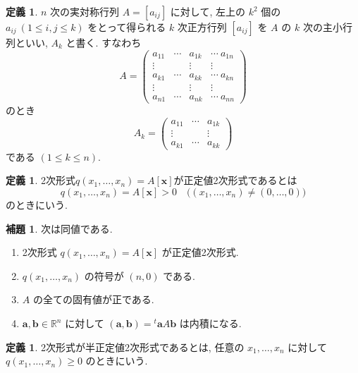\documentclass[dvipdfmx,a4paper,11pt]{article} %
\theoremstyle{definition}
\newtheorem{lem}[thm]{補題}
\newtheorem{defn}[thm]{定義}
\begin{document}
\begin{defn}
$n$ 次の実対称行列 $A=[a_{ij}]$ に対して, 左上の $k^2$ 個の $a_{ij}\ (1\leq i,j\leq k)$ をとって得られる $k$ 次正方行列 $[a_{ij}]$ を $A$ の $k$ 次の主小行列といい, $A_k$ と書く. すなわち
\[
A=
\left(
\begin{array}{ccc|c}
a_{11}&\cdots&a_{1k}&\cdots\ a_{1n}\\
\vdots&&\vdots&\vdots\\
a_{k1}&\cdots&a_{kk}&\cdots\ a_{kn}\\ \hline
\vdots&&\vdots&\vdots\\
a_{n1}&\cdots&a_{nk}&\cdots\ a_{nn}
\end{array}
\right)
\]
のとき
\[
A_k=
\begin{pmatrix}
a_{11}&\cdots&a_{1k}\\
\vdots&&\vdots\\
a_{k1}&\cdots&a_{kk}
\end{pmatrix}
\]
である $(1\leq k\leq n)$.
\end{defn}

\begin{defn}
2次形式\(q(x_1,\ldots,x_n)=A[\bm{x}]\)が正定値2次形式であるとは
\[
q(x_1,\ldots,x_n)=A[\bm{x}]>0
\quad
\bigl((x_1,\ldots,x_n)\neq(0,\ldots,0)\bigr)
\]
のときにいう.
\end{defn}

\begin{lem}
次は同値である. 
\begin{enumerate}
\item[(0)] 2次形式
\(
q(x_1,\ldots,x_n)=A[\bm{x}]
\)
が正定値2次形式. 
\item[(1)] $q(x_1,\ldots,x_n)$ の符号が $(n,0)$ である. 
\item[(2)] $A$ の全ての固有値が正である.
\item[(3)] $\bm{a},\bm{b}\in\mathbb{R}^n$ に対して
\(
(\bm{a},\bm{b})={}^{t}\!\bm{a}A\bm{b}
\)
は内積になる.
\end{enumerate}
\end{lem}

\begin{defn}
2次形式が半正定値2次形式であるとは, 任意の $x_1,\ldots,x_n$ に対して
\(
q(x_1,\ldots,x_n)\geq0
\)
のときにいう.
\end{defn}
\end{document}
